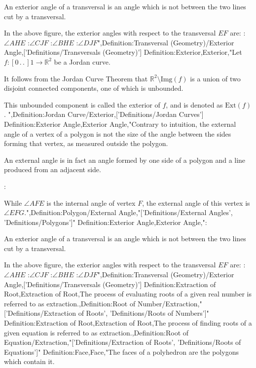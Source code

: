 An exterior angle of a transversal is an angle which is not between the two lines cut by a transversal.

In the above figure, the exterior angles with respect to the transversal $EF$ are:
:$\angle AHE$
:$\angle CJF$
:$\angle BHE$
:$\angle DJF$",Definition:Transversal (Geometry)/Exterior Angle,['Definitions/Transversals (Geometry)']
Definition:Exterior,Exterior,"Let $f: \left[ 0 \,.\,.\,   \right]1 \to \mathbb R^2$ be a Jordan curve.


It follows from the Jordan Curve Theorem that $\mathbb R^2 \setminus \mathrm {Img} \left( f \right)$ is a union of two disjoint connected components, one of which is unbounded.

This unbounded component is called the exterior of $f$, and is denoted as $\mathrm {Ext} \left( f \right)$.
",Definition:Jordan Curve/Exterior,['Definitions/Jordan Curves']
Definition:Exterior Angle,Exterior Angle,"Contrary to intuition, the external angle of a vertex of a polygon is not the size of the angle between the sides forming that vertex, as measured outside the polygon.

An external angle is in fact an angle formed by one side of a polygon and a line produced from an adjacent side.

:

While $\angle AFE$ is the internal angle of vertex $F$, the external angle of this vertex is $\angle EFG$.",Definition:Polygon/External Angle,"['Definitions/External Angles', 'Definitions/Polygons']"
Definition:Exterior Angle,Exterior Angle,":


An exterior angle of a transversal is an angle which is not between the two lines cut by a transversal.

In the above figure, the exterior angles with respect to the transversal $EF$ are:
:$\angle AHE$
:$\angle CJF$
:$\angle BHE$
:$\angle DJF$",Definition:Transversal (Geometry)/Exterior Angle,['Definitions/Transversals (Geometry)']
Definition:Extraction of Root,Extraction of Root,The process of evaluating roots of a given real number is referred to as extraction.,Definition:Root of Number/Extraction,"['Definitions/Extraction of Roots', 'Definitions/Roots of Numbers']"
Definition:Extraction of Root,Extraction of Root,The process of finding roots of a given equation is referred to as extraction.,Definition:Root of Equation/Extraction,"['Definitions/Extraction of Roots', 'Definitions/Roots of Equations']"
Definition:Face,Face,"The faces of a polyhedron are the polygons which contain it.



